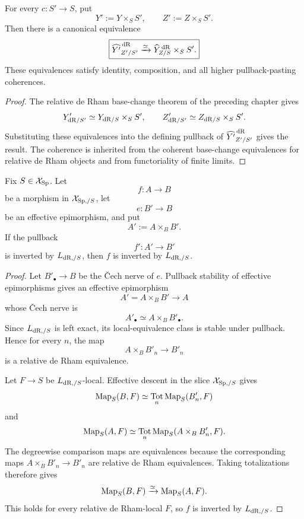 \begin{proposition}
\label{prop:intrinsic-relative-dr-completion-base-change}
For every \(c:S'\to S\), put
\[
    Y':=Y\times_SS',
    \qquad
    Z':=Z\times_SS'.
\]
Then there is a canonical equivalence
\[
\boxed{
    \widehat{Y'}^{\,\mathrm{dR}}_{Z'/S'}
    \xrightarrow{\simeq}
    \widehat Y^{\,\mathrm{dR}}_{Z/S}\times_SS'.
}
\]
These equivalences satisfy identity, composition, and all higher pullback-pasting coherences.
\end{proposition}

\begin{proof}
The relative de Rham base-change theorem of the preceding chapter gives
\[
    Y'_{\mathrm{dR}/S'}\simeq Y_{\mathrm{dR}/S}\times_SS',
    \qquad
    Z'_{\mathrm{dR}/S'}\simeq Z_{\mathrm{dR}/S}\times_SS'.
\]
Substituting these equivalences into the defining pullback of
\(\widehat{Y'}^{\,\mathrm{dR}}_{Z'/S'}\) gives the result.  The coherence is inherited from the coherent
base-change equivalences for relative de Rham objects and from functoriality of finite limits.
\end{proof}


\begin{lemma}
\label{lem:relative-dr-equivalence-target-local}
Fix \(S\in\mathcal X_{\mathrm{Sp}}\).  Let
\[
    f:A\longrightarrow B
\]
be a morphism in \(\mathcal X_{\mathrm{Sp},/S}\), let
\[
    e:B'\longrightarrow B
\]
be an effective epimorphism, and put
\[
    A':=A\times_BB'.
\]
If the pullback
\[
    f':A'\longrightarrow B'
\]
is inverted by \(L_{\mathrm{dR},/S}\), then \(f\) is inverted by \(L_{\mathrm{dR},/S}\).
\end{lemma}

\begin{proof}
Let \(B'_\bullet\to B\) be the \v{C}ech nerve of \(e\).  Pullback stability of effective
epimorphisms gives an effective epimorphism
\[
    A'=A\times_BB'\longrightarrow A
\]
whose \v{C}ech nerve is
\[
    A'_\bullet\simeq A\times_BB'_\bullet.
\]
Since \(L_{\mathrm{dR},/S}\) is left exact, its local-equivalence class is stable under pullback.  Hence for
every \(n\), the map
\[
    A\times_BB'_n\longrightarrow B'_n
\]
is a relative de Rham equivalence.

Let \(F\to S\) be \(L_{\mathrm{dR},/S}\)-local.  Effective descent in the slice
\(\mathcal X_{\mathrm{Sp},/S}\) gives
\[
    \operatorname{Map}_S(B,F)
    \simeq
    \operatorname*{Tot}_n\operatorname{Map}_S(B'_n,F)
\]
and
\[
    \operatorname{Map}_S(A,F)
    \simeq
    \operatorname*{Tot}_n\operatorname{Map}_S(A\times_BB'_n,F).
\]
The degreewise comparison maps are equivalences because the corresponding maps
\(A\times_BB'_n\to B'_n\) are relative de Rham equivalences.  Taking totalizations therefore gives
\[
    \operatorname{Map}_S(B,F)\xrightarrow{\simeq}\operatorname{Map}_S(A,F).
\]
This holds for every relative de Rham-local \(F\), so \(f\) is inverted by \(L_{\mathrm{dR},/S}\).
\end{proof}

